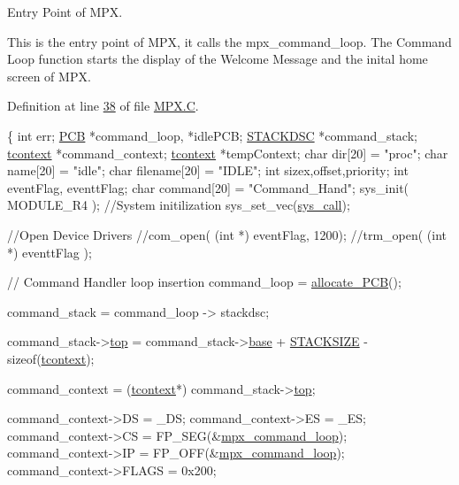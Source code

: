 Entry Point of MPX. 

This is the entry point of MPX, it calls the mpx\_\-command\_\-loop. The Command Loop function starts the display of the Welcome Message and the inital home screen of MPX. 

Definition at line \hyperlink{_m_p_x_8_c_source_l00038}{38} of file \hyperlink{_m_p_x_8_c_source}{MPX.C}.




\begin{DoxyCode}
           \{
        \textcolor{keywordtype}{int} err;
        \hyperlink{structprocess}{PCB} *command\_loop, *idlePCB;
        \hyperlink{structstack}{STACKDSC} *command\_stack;
        \hyperlink{structcontext}{tcontext} *command\_context;
        \hyperlink{structcontext}{tcontext} *tempContext;
        \textcolor{keywordtype}{char} dir[20] = \textcolor{stringliteral}{"proc"};
        \textcolor{keywordtype}{char} name[20] = \textcolor{stringliteral}{"idle"};
        \textcolor{keywordtype}{char} filename[20] = \textcolor{stringliteral}{"IDLE"};
        \textcolor{keywordtype}{int} sizex,offset,priority;
        \textcolor{keywordtype}{int} eventFlag, eventtFlag;
        \textcolor{keywordtype}{char} command[20] = \textcolor{stringliteral}{"Command\_Hand"};
        sys\_init( MODULE\_R4 ); \textcolor{comment}{//System initilization}
        sys\_set\_vec(\hyperlink{mpx__r3_8c_abeb8ddb92acb8fa40e902b98f2a1ccfb}{sys_call});

        \textcolor{comment}{//Open Device Drivers}
        \textcolor{comment}{//com\_open( (int *) eventFlag, 1200);}
       \textcolor{comment}{//trm\_open(  (int *) eventtFlag );}

        \textcolor{comment}{// Command Handler loop insertion}
        command\_loop = \hyperlink{mpx__r2_8c_a58a8a1ea0a96b9ecf0be29179a5a0a1e}{allocate_PCB}();

        command\_stack = command\_loop -> stackdsc;

        command\_stack->\hyperlink{structstack_adf145fa22a24464ff19409e2618a583d}{top} = command\_stack->\hyperlink{structstack_a1cdb71e486a79747d482aa46f6b10290}{base} + \hyperlink{mpx__r2_8h_a21d9543c516fffee84a7963224271f95}{STACKSIZE} - \textcolor{keyword}{sizeof}(\hyperlink{structcontext}{tcontext});

        command\_context = (\hyperlink{structcontext}{tcontext}*) command\_stack->\hyperlink{structstack_adf145fa22a24464ff19409e2618a583d}{top};

        command\_context->DS = \_DS;
        command\_context->ES = \_ES;
        command\_context->CS = FP\_SEG(&\hyperlink{_m_p_x___c_m_d_8_c_ab2f64c5ce0432edca230a87739501703}{mpx_command_loop});
        command\_context->IP = FP\_OFF(&\hyperlink{_m_p_x___c_m_d_8_c_ab2f64c5ce0432edca230a87739501703}{mpx_command_loop});
        command\_context->FLAGS = 0x200;


\end{DoxyCode}
